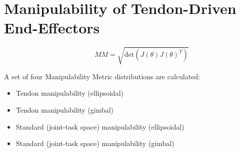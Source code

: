 \documentclass[journal]{IEEEtran}
\begin{document}
\section{Manipulability of Tendon-Driven End-Effectors}

\label{manoftde}
\begin{equation} 
\hspace{40pt} MM = \sqrt{\mathrm{det}(J(\theta )J(\theta )^{T})} 
 \label{eq1}
\end{equation}


A set of four Manipulability Metric distributions are calculated: 


\begin{itemize}
 \item Tendon manipulability (ellipsoidal)
 \item Tendon manipulability (gimbal)
 \item Standard (joint-task space) manipulability (ellipsoidal)
 \item Standard (joint-task space) manipulability (gimbal)
\end{itemize}



\end{document}
